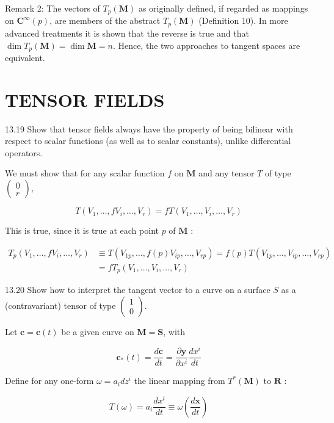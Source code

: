 \documentclass[10pt]{article}
\begin{document}
Remark 2: The vectors of $T_{p}(\mathbf{M})$ as originally defined, if regarded as mappings on $\mathbf{C}^{\infty}(p)$, are members of the abstract $T_{p}(\mathbf{M})$ (Definition 10). In more advanced treatments it is shown that the reverse is true and that $\operatorname{dim} T_{p}(\mathbf{M})=\operatorname{dim} \mathbf{M}=n$. Hence, the two approaches to tangent spaces are equivalent.

\section*{TENSOR FIELDS}
13.19 Show that tensor fields always have the property of being bilinear with respect to scalar functions (as well as to scalar constants), unlike differential operators.

We must show that for any scalar function $f$ on $\mathbf{M}$ and any tensor $T$ of type $\left(\begin{array}{c}0 \\ r\end{array}\right)$,

$$
T\left(V_{1}, \ldots, f V_{i}, \ldots, V_{r}\right)=f T\left(V_{1}, \ldots, V_{i}, \ldots, V_{r}\right)
$$

This is true, since it is true at each point $p$ of $\mathbf{M}$ :

$$
\begin{aligned}
T_{p}\left(V_{1}, \ldots, f V_{i}, \ldots, V_{r}\right) & \equiv T\left(V_{1 p}, \ldots, f(p) V_{i p}, \ldots, V_{r p}\right)=f(p) T\left(V_{1 p}, \ldots, V_{i p}, \ldots, V_{r p}\right) \\
& =f T_{p}\left(V_{1}, \ldots, V_{i}, \ldots, V_{r}\right)
\end{aligned}
$$

13.20 Show how to interpret the tangent vector to a curve on a surface $S$ as a (contravariant) tensor of type $\left(\begin{array}{l}1 \\ 0\end{array}\right)$.

Let $\mathbf{c}=\mathbf{c}(t)$ be a given curve on $\mathbf{M}=\mathbf{S}$, with

$$
\mathbf{c}_{*}(t)=\frac{d \mathbf{c}}{d t}=\frac{\partial \mathbf{y}}{\partial x^{i}} \frac{d x^{i}}{d t}
$$

Define for any one-form $\omega=a_{i} d z^{i}$ the linear mapping from $T^{*}(\mathbf{M})$ to $\mathbf{R}$ :

$$
T(\omega)=a_{i} \frac{d x^{i}}{d t} \equiv \omega\left(\frac{d \mathbf{x}}{d t}\right)
$$
\end{document}
